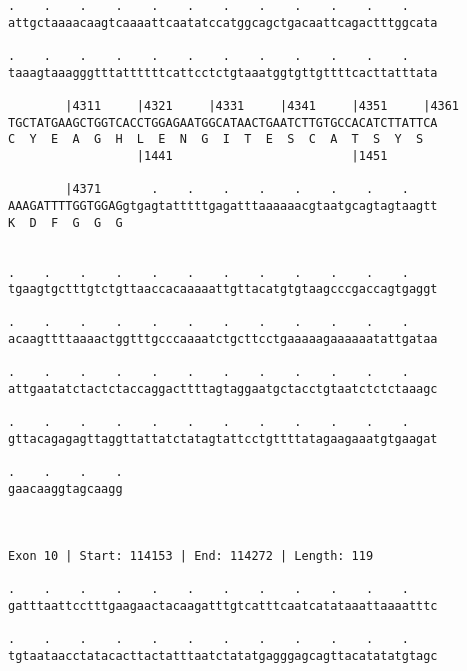 \documentclass{article}
\begin{document}
\begin{Verbatim}
.    .    .    .    .    .    .    .    .    .    .    .    
attgctaaaacaagtcaaaattcaatatccatggcagctgacaattcagactttggcata
                                                            
.    .    .    .    .    .    .    .    .    .    .    .    
taaagtaaagggtttattttttcattcctctgtaaatggtgttgttttcacttatttata
                                                            
        |4311     |4321     |4331     |4341     |4351     |4361
TGCTATGAAGCTGGTCACCTGGAGAATGGCATAACTGAATCTTGTGCCACATCTTATTCA
C  Y  E  A  G  H  L  E  N  G  I  T  E  S  C  A  T  S  Y  S  
                  |1441                         |1451       
  
        |4371       .    .    .    .    .    .    .    .    
AAAGATTTTGGTGGAGgtgagtatttttgagatttaaaaaacgtaatgcagtagtaagtt
K  D  F  G  G  G                                            
                                                            
  
.    .    .    .    .    .    .    .    .    .    .    .    
tgaagtgctttgtctgttaaccacaaaaattgttacatgtgtaagcccgaccagtgaggt
                                                            
.    .    .    .    .    .    .    .    .    .    .    .    
acaagttttaaaactggtttgcccaaaatctgcttcctgaaaaagaaaaaatattgataa
                                                            
.    .    .    .    .    .    .    .    .    .    .    .    
attgaatatctactctaccaggacttttagtaggaatgctacctgtaatctctctaaagc
                                                            
.    .    .    .    .    .    .    .    .    .    .    .    
gttacagagagttaggttattatctatagtattcctgttttatagaagaaatgtgaagat
                                                            
.    .    .    .
gaacaaggtagcaagg
                
                
 
Exon 10 | Start: 114153 | End: 114272 | Length: 119
 
.    .    .    .    .    .    .    .    .    .    .    .    
gatttaattcctttgaagaactacaagatttgtcatttcaatcatataaattaaaatttc
                                                            
.    .    .    .    .    .    .    .    .    .    .    .    
tgtaataacctatacacttactatttaatctatatgagggagcagttacatatatgtagc
                                                            

\end{Verbatim}
\end{document}
